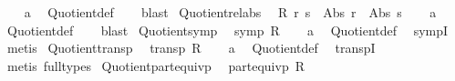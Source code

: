 \begin{isabellebody}
%
\isadelimproof
\ \ %
\endisadelimproof
%
\isatagproof
{}\isamarkupfalse%
\ a\ \isamarkupfalse%
\ Quotient{}{\isacharunderscore}{\kern0pt}def\isanewline
\ \ \isamarkupfalse%
\ blast%
\endisatagproof
{\isafoldproof}%
%
\isadelimproof
\isanewline
%
\endisadelimproof
\isanewline
{}\isamarkupfalse%
\ Quotient{}{\isacharunderscore}{\kern0pt}rel{\isacharunderscore}{\kern0pt}abs{\isacharcolon}{\kern0pt}\isanewline
\ \ {\isachardoublequoteopen}R\ r\ s\ {\isasymLongrightarrow}\ Abs\ r\ {\isacharequal}{\kern0pt}\ Abs\ s{\isachardoublequoteclose}\isanewline
%
\isadelimproof
\ \ %
\endisadelimproof
%
\isatagproof
{}\isamarkupfalse%
\ a\ \isamarkupfalse%
\ Quotient{}{\isacharunderscore}{\kern0pt}def\isanewline
\ \ \isamarkupfalse%
\ blast%
\endisatagproof
{\isafoldproof}%
%
\isadelimproof
\isanewline
%
\endisadelimproof
\isanewline
{}\isamarkupfalse%
\ Quotient{}{\isacharunderscore}{\kern0pt}symp{\isacharcolon}{\kern0pt}\isanewline
\ \ {\isachardoublequoteopen}symp\ R{\isachardoublequoteclose}\isanewline
%
\isadelimproof
\ \ %
\endisadelimproof
%
\isatagproof
{}\isamarkupfalse%
\ a\ \isamarkupfalse%
\ Quotient{}{\isacharunderscore}{\kern0pt}def\ \isamarkupfalse%
\ sympI\ \isamarkupfalse%
\ metis%
\endisatagproof
{\isafoldproof}%
%
\isadelimproof
\isanewline
%
\endisadelimproof
\isanewline
{}\isamarkupfalse%
\ Quotient{}{\isacharunderscore}{\kern0pt}transp{\isacharcolon}{\kern0pt}\isanewline
\ \ {\isachardoublequoteopen}transp\ R{\isachardoublequoteclose}\isanewline
%
\isadelimproof
\ \ %
\endisadelimproof
%
\isatagproof
{}\isamarkupfalse%
\ a\ \isamarkupfalse%
\ Quotient{}{\isacharunderscore}{\kern0pt}def\ \isamarkupfalse%
\ transpI\ \isamarkupfalse%
\ {\isacharparenleft}{\kern0pt}metis\ {\isacharparenleft}{\kern0pt}full{\isacharunderscore}{\kern0pt}types{\isacharparenright}{\kern0pt}{\isacharparenright}{\kern0pt}%
\endisatagproof
{\isafoldproof}%
%
\isadelimproof
\isanewline
%
\endisadelimproof
\isanewline
{}\isamarkupfalse%
\ Quotient{}{\isacharunderscore}{\kern0pt}part{\isacharunderscore}{\kern0pt}equivp{\isacharcolon}{\kern0pt}\isanewline
\ \ {\isachardoublequoteopen}part{\isacharunderscore}{\kern0pt}equivp\ R{\isachardoublequoteclose}\isanewline
%
\isadelimproof

\end{isabellebody}
